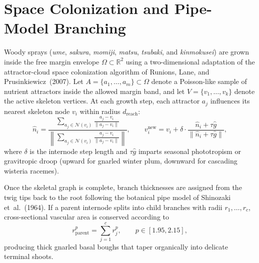 \documentclass[11pt,a4paper,twoside]{article}
\begin{document}
\section{Space Colonization and Pipe-Model Branching}

Woody sprays (\emph{ume}, \emph{sakura}, \emph{momiji}, \emph{matsu}, \emph{tsubaki}, and \emph{kinmokusei}) are grown inside the free margin envelope $\Omega \subset \mathbb{R}^2$ using a two-dimensional adaptation of the attractor-cloud space colonization algorithm of Runions, Lane, and Prusinkiewicz~(2007). Let $A = \{a_1, \dots, a_m\} \subset \Omega$ denote a Poisson-like sample of nutrient attractors inside the allowed margin band, and let $V = \{v_1, \dots, v_k\}$ denote the active skeleton vertices. At each growth step, each attractor $a_j$ influences its nearest skeleton node $v_i$ within radius $d_{\mathrm{reach}}$:
\begin{equation}
  \hat{n}_i = \frac{\sum_{a_j \in \mathcal{N}(v_i)} \frac{a_j - v_i}{\|a_j - v_i\|}}{\left\|\sum_{a_j \in \mathcal{N}(v_i)} \frac{a_j - v_i}{\|a_j - v_i\|}\right\|},
  \qquad
  v_{i}^{\mathrm{new}} = v_i + \delta \cdot \frac{\hat{n}_i + \tau \hat{g}}{\|\hat{n}_i + \tau \hat{g}\|},
  \label{eq:colonize}
\end{equation}
where $\delta$ is the internode step length and $\tau \hat{g}$ imparts seasonal phototropism or gravitropic droop (upward for gnarled winter plum, downward for cascading wisteria racemes).

Once the skeletal graph is complete, branch thicknesses are assigned from the twig tips back to the root following the botanical pipe model of Shinozaki et~al.~(1964). If a parent internode splits into child branches with radii $r_1, \dots, r_c$, cross-sectional vascular area is conserved according to
\begin{equation}
  r_{\mathrm{parent}}^p = \sum_{j=1}^{c} r_j^p, \qquad p \in [1.95, 2.15],
  \label{eq:pipemodel}
\end{equation}
producing thick gnarled basal boughs that taper organically into delicate terminal shoots.
\end{document}
